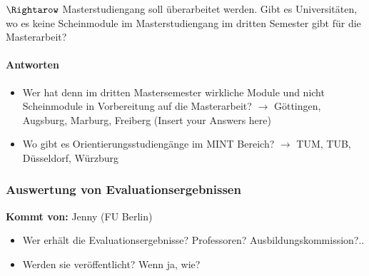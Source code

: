       $\Rightarow$ Masterstudiengang soll überarbeitet werden. Gibt es Universitäten, wo es keine Scheinmodule im Masterstudiengang im dritten Semester gibt für die Masterarbeit?

      \paragraph{Antworten}
        \begin{itemize}
          \item Wer hat denn im dritten Mastersemester wirkliche Module und nicht Scheinmodule in Vorbereitung auf die Masterarbeit?
            $\rightarrow$ Göttingen, Augsburg, Marburg, Freiberg (Insert your Answers here)
          \item Wo gibt es Orientierungsstudiengänge im MINT Bereich?
            $\rightarrow$ TUM, TUB, Düsseldorf, Würzburg
        \end{itemize}

    \subsubsection{Auswertung von Evaluationsergebnissen}

      \textbf{Kommt von:} Jenny (FU Berlin)

      \begin{itemize}
        \item Wer erhält die Evaluationsergebnisse? Professoren? Ausbildungskommission?..
        \item Werden sie veröffentlicht? Wenn ja, wie?
      \end{itemize}

